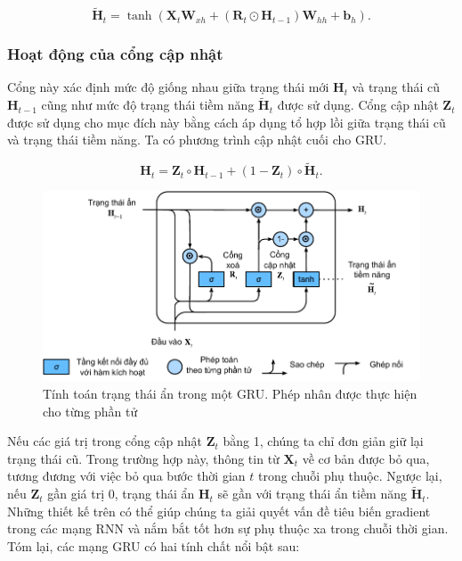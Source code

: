\documentclass[conference]{IEEEtran}
\begin{document}
\begin{equation*}
    \tilde{\mathbf{H}}_t = \tanh (\mathbf{X}_t \mathbf{W}_{xh} + (\mathbf{R}_t \odot \mathbf{H}_{t-1}) \mathbf{W}_{hh} + \mathbf{b}_h).
\end{equation*}

\subsubsection{Hoạt động của cổng cập nhật}
Cổng này xác định mức độ giống nhau giữa trạng thái mới \(\mathbf{H}_t \) và trạng thái cũ \(\mathbf{H}_{t-1}\) cũng như mức độ trạng thái tiềm năng \(\widetilde{\mathbf{H}}_t\) được sử dụng. Cổng cập nhật \(\mathbf{Z}_t\) được sử dụng cho mục đích này bằng cách áp dụng tổ hợp lồi giữa trạng thái cũ và trạng thái tiềm năng. Ta có phương
trình cập nhật cuối cho GRU.

\begin{equation*}
    \mathbf{H}_t = \mathbf{Z}_t \circ \mathbf{H}_{t-1} + (1 - \mathbf{Z}_t) \circ \tilde{\mathbf{H}}_t.
\end{equation*}

\begin{figure}[H]
    \centering
    \begin{minipage}{0.23\textwidth}
        \centering
        \includegraphics[width=1\textwidth]{bibliography/figure/GRU/gru_3.pdf}
        \caption{Tính toán trạng thái ẩn trong một GRU. Phép nhân được thực hiện cho từng phần tử}
        \label{fig:gru_up}
    \end{minipage}

\end{figure}

Nếu các giá trị trong cổng cập nhật $\mathbf{Z}_t$ bằng 1, chúng ta chỉ đơn giản giữ lại trạng thái cũ. Trong trường hợp này, thông tin từ $\mathbf{X}_t$ về cơ bản được bỏ qua, tương đương với việc bỏ qua bước thời gian $t$ trong chuỗi phụ thuộc. Ngược lại, nếu $\mathbf{Z}_t$ gần giá trị 0, trạng thái ẩn $\mathbf{H}_t$ sẽ gần với trạng thái ẩn tiềm năng $\tilde{\mathbf{H}}_t$. Những thiết kế trên có thể giúp chúng ta giải quyết vấn đề tiêu biến gradient trong các mạng RNN và nắm bắt tốt hơn sự phụ thuộc xa trong chuỗi thời gian. Tóm lại, các mạng GRU có hai tính chất nổi bật sau:
\end{document}
